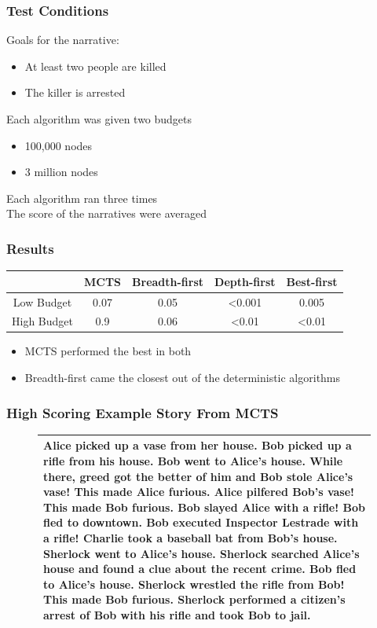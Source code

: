 \documentclass{beamer}
\begin{document}

\begin{frame}
\frametitle{Test Conditions}
Goals for the narrative:
\begin{itemize}
	\item At least two people are killed
	\item The killer is arrested
\end{itemize}
Each algorithm was given two budgets
\begin{itemize}
	\item 100,000 nodes
	\item 3 million nodes
\end{itemize}
Each algorithm ran three times \\
The score of the narratives were averaged
\end{frame}

\begin{frame}[fragile]
\frametitle{Results}
\begin{table}[h]
\centering
	\begin{tabular}{ c | c | c | c | c |}
	\cline{2-5}	 
	 & MCTS & Breadth-first & Depth-first & Best-first \\ \hline
	\multicolumn{1}{|p{1.5cm}|}{Low Budget} & 0.07 & 0.05 & <0.001 & 0.005 \\ \hline
	\multicolumn{1}{|p{1.5cm}|}{High Budget} & 0.9 & 0.06 & <0.01 & <0.01 \\ \hline
	\end{tabular}
\end{table}
\begin{itemize}
	\item MCTS performed the best in both
	\item Breadth-first came the closest out of the deterministic algorithms
\end{itemize}
\end{frame}

\begin{frame}[fragile]
\frametitle{High Scoring Example Story From MCTS}
\begin{figure}[h]
\begin{tabular}{|p{10cm}|}
\hline
Alice picked up a vase from her house. Bob picked up a rifle from his house. Bob went to Alice's house. While there, greed got the better of him and Bob stole Alice's vase! This made Alice furious. Alice pilfered Bob's vase! This made Bob furious. Bob slayed Alice with a rifle! Bob fled to downtown. Bob executed Inspector Lestrade with a rifle! Charlie took a baseball bat from Bob's house. Sherlock went to Alice's house. Sherlock searched Alice's house and found a clue about the recent crime. Bob fled to Alice's house. Sherlock wrestled the rifle from Bob! This made Bob furious. Sherlock performed a citizen's arrest of Bob with his rifle and took Bob to jail. \\ \hline
\end{tabular}
\centering
\label{fig:GoodStory}
\end{figure}
\end{frame}
\end{document}
